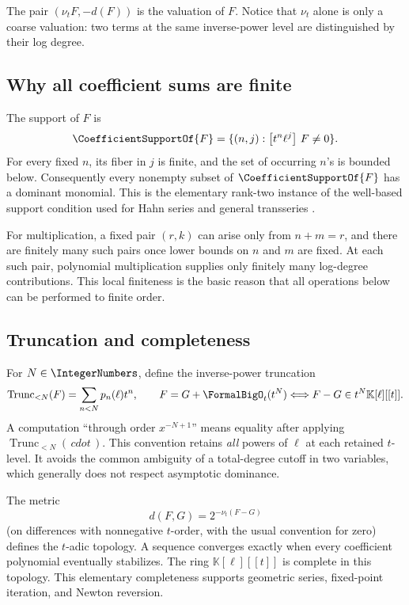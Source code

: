 \documentclass[11pt,oneside]{article}
\numberwithin{equation}{section}
\theoremstyle{definition}
\newcommand{\K}{\mathbb{K}}
\newcommand{\ordx}{\nu_t}
\newcommand{\TransseriesCoefficientOf}[2]{\left[#1\right]\,#2}
\newcommand{\TransseriesTruncateBelow}[2]{%
  \operatorname{Trunc}_{<#2}\!\left(#1\right)%
}
\begin{document}
The pair \((\ordx F,-d(F))\) is the valuation of \(F\).  Notice that
\(\ordx\) alone is only a coarse valuation: two terms at the same inverse-power
level are distinguished by their log degree.

\subsection{Why all coefficient sums are finite}

The support of \(F\) is
\[
  \CoefficientSupportOf{F}=\{(n,j):\TransseriesCoefficientOf{t^n\ell^j}{F}\ne0\}.
\]
For every fixed \(n\), its fiber in \(j\) is finite, and the set of occurring
\(n\)'s is bounded below.  Consequently every nonempty subset of \(\CoefficientSupportOf{F}\)
has a dominant monomial.  This is the elementary rank-two instance of the
well-based support condition used for Hahn series and general transseries
\cite{EdgarBeginners,Hahn1907}.

For multiplication, a fixed pair \((r,k)\) can arise only from
\(n+m=r\), and there are finitely many such pairs once lower bounds on \(n\) and
\(m\) are fixed.  At each such pair, polynomial multiplication supplies only
finitely many log-degree contributions.  This local finiteness is the basic
reason that all operations below can be performed to finite order.

\subsection{Truncation and completeness}

For \(N\in\IntegerNumbers\), define the inverse-power truncation
\begin{equation}\label{eq:truncation}
  \TransseriesTruncateBelow{F}{N}=\sum_{n<N}p_n(\ell)t^n,
  \qquad F=G+\FormalBigO_t(t^N)
  \Longleftrightarrow F-G\in t^N\K[\ell][[t]].
\end{equation}
A computation ``through order \(x^{-N+1}\)'' means equality after applying
\(\TransseriesTruncateBelow{\,cdot\,}{N}\).
This convention retains \emph{all} powers of \(\ell\) at each retained
\(t\)-level.  It avoids the common ambiguity of a total-degree cutoff in two
variables, which generally does not respect asymptotic dominance.

The metric
\[
  d(F,G)=2^{-\ordx(F-G)}
\]
(on differences with nonnegative \(t\)-order, with the usual convention for
zero) defines the \(t\)-adic topology.  A sequence converges exactly when every
coefficient polynomial eventually stabilizes.  The ring
\(\K[\ell][[t]]\) is complete in this topology.  This elementary completeness
supports geometric series, fixed-point iteration, and Newton reversion.
\end{document}

